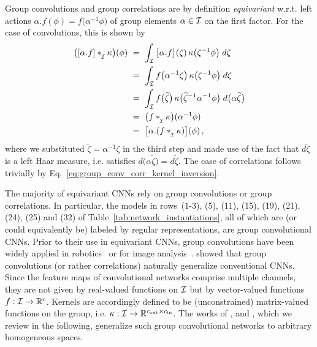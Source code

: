 Group convolutions and group correlations are by definition \emph{equivariant} w.r.t. left actions $\alpha.f(\phi) = f\big( \alpha^{-1}\phi \big)$ of group elements $\alpha\in\mathcal{I}$ on the first factor.
For the case of convolutions, this is shown by
\begin{align}\label{eq:group_conv_equivariance}
    \big( [\alpha.f] \ast_{\overset{}{\protect\scalebox{.64}{$\mkern-.5mu \I$}}} \kappa \big)(\phi)
    \ &=\ \int_{\I} \big[\alpha.f \big](\zeta)\, \kappa\big( \zeta^{-1} \phi \big) \; d\zeta \notag \\
    \ &=\ \int_{\I} f\big( \alpha^{-1} \zeta\big)\, \kappa\big( \zeta^{-1} \phi \big) \; d\zeta \notag \\
    \ &=\ \int_{\I} f\big(\widetilde{\zeta} \big)\, \kappa\big( \widetilde{\zeta}^{-1} \alpha^{-1} \phi \big) \; d\big( \alpha \widetilde{\zeta} \big) \notag \\
    \ &=\ \big( f \ast_{\overset{}{\protect\scalebox{.64}{$\mkern-.5mu \I$}}} \kappa \big) (\alpha^{-1} \phi) \notag \\
    \ &=\ \big[\alpha.( f \ast_{\overset{}{\protect\scalebox{.64}{$\mkern-.5mu \I$}}} \kappa )\big] (\phi) \,,
\end{align}
where we substituted $\widetilde{\zeta} = \alpha^{-1}\zeta$ in the third step and made use of the fact that $d\widetilde{\zeta}$ is a left Haar measure, i.e. satisfies $d\big(\alpha \widetilde{\zeta}\big) = d\widetilde{\zeta}$.
The case of correlations follows trivially by Eq.~\eqref{eq:group_conv_corr_kernel_inversion}.


The majority of equivariant CNNs rely on group convolutions or group correlations.
In particular, the models in rows~(1-3), (5), (11), (15), (19), (21), (24), (25) and (32) of Table~\ref{tab:network_instantiations}, all of which are (or could equivalently be) labeled by regular representations, are group convolutional CNNs.
Prior to their use in equivariant CNNs, group convolutions have been widely applied in robotics~\cite{chirikjian1998numerical} or for image analysis~\cite{mallat2012group,sifre2012combined,Sifre2013-GSCAT,bruna2013invariant,sifre2014rigid,oyallon2015scattering}.
\citet{Cohen2016-GCNN} showed that group convolutions (or rather correlations) naturally generalize conventional CNNs.
Since the feature maps of convolutional networks comprise multiple channels, they are not given by real-valued functions on $\mathcal{I}$ but by vector-valued functions $f: \mathcal{I} \to \mathbb{R}^c$.
Kernels are accordingly defined to be (unconstrained) matrix-valued functions on the group, i.e. $\kappa: \mathcal{I} \to \mathbb{R}^{{c_\textup{out}}\times{c_\textup{in}}}$.
The works of \citet{Kondor2018-GENERAL}, \citet{bekkers2020bspline} and \citet{Cohen2018-intertwiners}\cite{Cohen2019-generaltheory}, which we review in the following, generalize such group convolutional networks to arbitrary homogeneous spaces.







